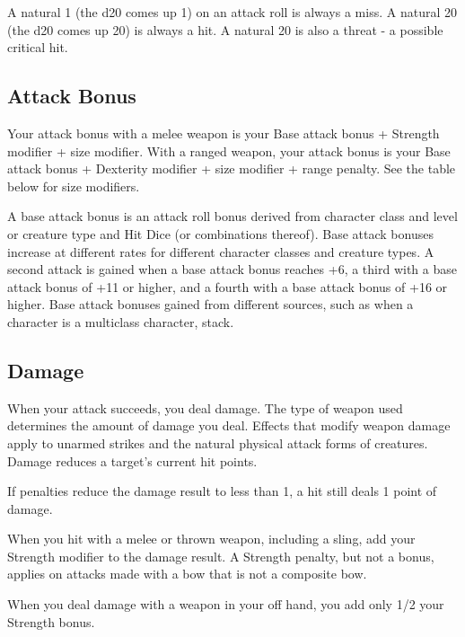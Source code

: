 \vspace*{10pt}

A natural 1 (the d20 comes up 1) on an attack roll is always a miss. A natural 20 (the d20 comes up 20) is always a hit. A natural 20 is also a threat - a possible critical hit.

\subsection{Attack Bonus}

Your attack bonus with a melee weapon is your Base attack bonus + Strength modifier + size modifier. With a ranged weapon, your attack bonus is your Base attack bonus + Dexterity modifier + size modifier + range penalty. See the table below for size modifiers.

\vspace*{10pt}

A base attack bonus is an attack roll bonus derived from character class and level or creature type and Hit Dice (or combinations thereof). Base attack bonuses increase at different rates for different character classes and creature types. A second attack is gained when a base attack bonus reaches +6, a third with a base attack bonus of +11 or higher, and a fourth with a base attack bonus of +16 or higher. Base attack bonuses gained from different sources, such as when a character is a multiclass character, stack. 

\subsection{Damage}
When your attack succeeds, you deal damage. The type of weapon used determines the amount of damage you deal. Effects that modify weapon damage apply to unarmed strikes and the natural physical attack forms of creatures. Damage reduces a target's current hit points.

\vspace*{10pt}

If penalties reduce the damage result to less than 1, a hit still deals 1 point of damage.

When you hit with a melee or thrown weapon, including a sling, add your Strength modifier to the damage result. A Strength penalty, but not a bonus, applies on attacks made with a bow that is not a composite bow.

When you deal damage with a weapon in your off hand, you add only 1/2 your Strength bonus.

